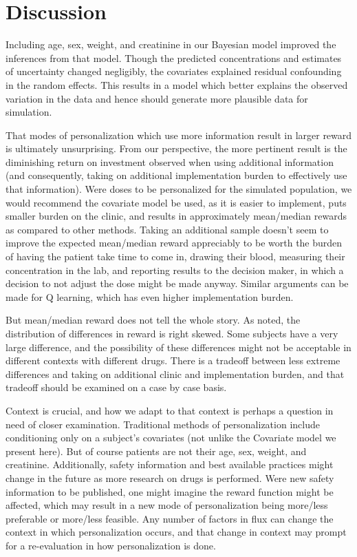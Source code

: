 \section{Discussion}\label{ss:discussion}

Including age, sex, weight, and creatinine in our Bayesian model improved the inferences from that model.  Though the predicted concentrations and estimates of uncertainty changed negligibly, the covariates explained residual confounding in the random effects. This results in a model which better explains the observed variation in the data and hence should generate more plausible data for simulation.

That modes of personalization which use more information result in larger reward is ultimately unsurprising. From our perspective, the more pertinent result is the diminishing return on investment observed when using additional information (and consequently, taking on additional implementation burden to effectively use that information).  Were doses to be personalized for the simulated population, we would recommend the covariate model be used, as it is easier to implement, puts smaller burden on the clinic, and results in approximately mean/median rewards as compared to other methods.  Taking an additional sample doesn’t seem to improve the expected mean/median reward appreciably to be worth the burden of having the patient take time to come in, drawing their blood, measuring their concentration in the lab, and reporting results to the decision maker, in which a decision to not adjust the dose might be made anyway. Similar arguments can be made for Q learning, which has even higher implementation burden.

But mean/median reward does not tell the whole story.  As noted, the distribution of differences in reward is right skewed.  Some subjects have a very large difference, and the possibility of these differences might not be acceptable in different contexts with different drugs.  There is a tradeoff between less extreme differences and taking on additional clinic and implementation burden, and that tradeoff should be examined on a case by case basis.

Context is crucial, and how we adapt to that context is perhaps a question in need of closer examination.  Traditional methods of personalization include conditioning only on a subject’s covariates (not unlike the Covariate model we present here).  But of course patients are not their age, sex, weight, and creatinine.  Additionally, safety information and best available practices might change in the future as more research on drugs is performed. Were new safety information to be published, one might imagine the reward function might be affected, which may result in a new mode of personalization being more/less preferable or more/less feasible.  Any number of factors in flux can change the context in which personalization occurs, and that change in context may prompt for a re-evaluation in how personalization is done.

